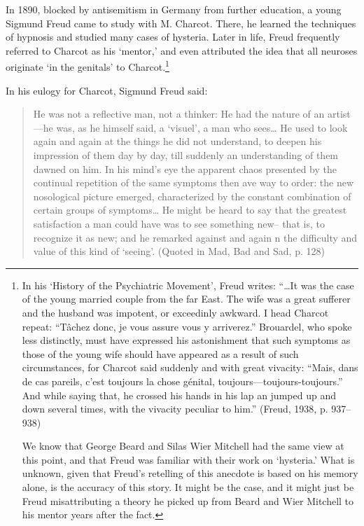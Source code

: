 In 1890, blocked by antisemitism in Germany from further education, a young Sigmund Freud came to study with M. Charcot. There, he learned the techniques of hypnosis and studied many cases of hysteria. Later in life, Freud frequently referred to Charcot as his `mentor,' and even attributed the idea that all neuroses originate `in the genitals' to Charcot.\footnote{In his `History of the Psychiatric Movement', Freud writes: “{\ldots}It was the case of the young married couple from the far East. The wife was a great sufferer and the husband was impotent, or exceedinly awkward. I head Charcot repeat: “Tâchez donc, je vous assure vous y arriverez.” Brouardel, who spoke less distinctly, must have expressed his astonishment that such symptoms as those of the young wife should have appeared as a result of such circumstances, for Charcot said suddenly and with great vivacity: “Mais, dans de cas pareils, c'est toujours la chose génital, toujours—toujours-toujours.” And while saying that, he crossed his hands in his lap an jumped up and down several times, with the vivacity peculiar to him.” (Freud, 1938, p. 937--938)

We know that George Beard and Silas Wier Mitchell had the same view at this point, and that Freud was familiar with their work on ‘hysteria.’ What is unknown, given that Freud's retelling of this anecdote is based on his memory alone, is the accuracy of this story. It might be the case, and it might just be Freud misattributing a theory he picked up from Beard and Wier Mitchell to his mentor years after the fact.}

In his eulogy for Charcot, Sigmund Freud said:

\begin{quote}

He was not a reflective man, not a thinker: He had the nature of an artist—he was, as he himself said, a `visuel', a man who sees{\ldots} He used to look again and again at the things he did not understand, to deepen his impression of them day by day, till suddenly an understanding of them dawned on him. In his mind's eye the apparent chaos presented by the continual repetition of the same symptoms then ave way to order: the new nosological picture emerged, characterized by the constant combination of certain groups of symptoms{\ldots} He might be heard to say that the greatest satisfaction a man could have was to see something new-- that is, to recognize it as new; and he remarked against and again n the difficulty and value of this kind of `seeing'. (Quoted in Mad, Bad and Sad, p. 128)
\end{quote}

